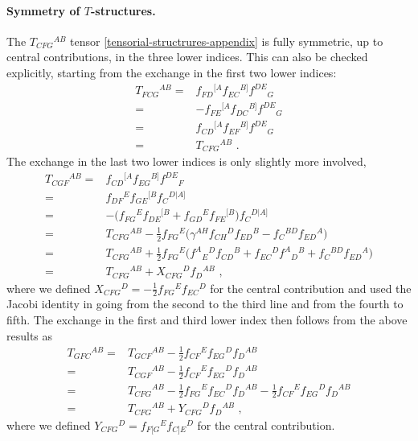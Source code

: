 \documentclass[12pt]{article}
\numberwithin{equation}{section}
\begin{document}
\paragraph{Symmetry of $T$-structures.}
The $T_{CFG}{}^{AB}$ tensor \eqref{tensorial-structrures-appendix} is fully symmetric, up to central contributions, in the three lower indices. This can also be checked explicitly, starting from the exchange in the first two lower indices:
\begin{equation}\label{T-sym-first-two-indices}
\begin{aligned}
T_{FCG}{}^{AB}=&f_{FD}{}^{[A}f_{EC}{}^{B]}f^{DE}{}_{G}
\\
=&-f_{FE}{}^{[A}f_{DC}{}^{B]}f^{DE}{}_{G}
\\
=&f_{CD}{}^{[A}f_{EF}{}^{B]}f^{DE}{}_{G}
\\
=&T_{CFG}{}^{AB} \,\, .
\end{aligned}
\end{equation}
The exchange in the last two lower indices is only slightly more involved,
\begin{equation}\label{T-sym-last-two-indices}
\begin{aligned}
T_{CGF}{}^{AB}=&f_{CD}{}^{[A}f_{EG}{}^{B]}f^{DE}{}_{F}
\\
=&f_{DF}{}^{E}f_{GE}{}^{[B}f_{C}{}^{D|A]}
\\
=&-\bigl( f_{FG}{}^{E}f_{DE}{}^{[B}+f_{GD}{}^{E}f_{FE}{}^{[B} \bigr)f_{C}{}^{D|A]}
\\
=&T_{CFG}{}^{AB}-\tfrac{1}{2}f_{FG}{}^{E}\bigl( \gamma^{AH}f_{CH}{}^{D}f_{ED}{}^{B}-f_{C}{}^{BD}f_{ED}{}^{A} \bigr)
\\
=&T_{CFG}{}^{AB}+\tfrac{1}{2}f_{FG}{}^{E}\bigl( f^{A}{}_{E}{}^{D}f_{CD}{}^{B}+f_{EC}{}^{D}f^{A}{}_{D}{}^{B}+f_{C}{}^{BD}f_{ED}{}^{A}\bigr)
\\
=&T_{CFG}{}^{AB}+X_{CFG}{}^{D}f_{D}{}^{AB} \,\, ,
\end{aligned}
\end{equation}
where we defined $X_{CFG}{}^{D}=-\tfrac{1}{2}f_{FG}{}^{E}f_{EC}{}^{D}$ for the central contribution and used the Jacobi identity in going from the second to the third line and from the fourth to fifth. The exchange in the first and third lower index then follows from the above results as
\begin{equation}\label{T-sym-first-and-last-indices}
\begin{aligned}
T_{GFC}{}^{AB}=&T_{GCF}{}^{AB}-\tfrac{1}{2}f_{CF}{}^{E}f_{EG}{}^{D}f_{D}{}^{AB}
\\
=& T_{CGF}{}^{AB}-\tfrac{1}{2}f_{CF}{}^{E}f_{EG}{}^{D}f_{D}{}^{AB}
\\
=& T_{CFG}{}^{AB}-\tfrac{1}{2}f_{FG}{}^{E}f_{EC}{}^{D}f_{D}{}^{AB}-\tfrac{1}{2}f_{CF}{}^{E}f_{EG}{}^{D}f_{D}{}^{AB}
\\
=& T_{CFG}{}^{AB}+Y_{CFG}{}^{D}f_{D}{}^{AB} \,\, ,
\end{aligned}
\end{equation}
where we defined $Y_{CFG}{}^{D}=f_{F[G}{}^{E}f_{C]E}{}^{D}$ for the central contribution. 
\end{document}
